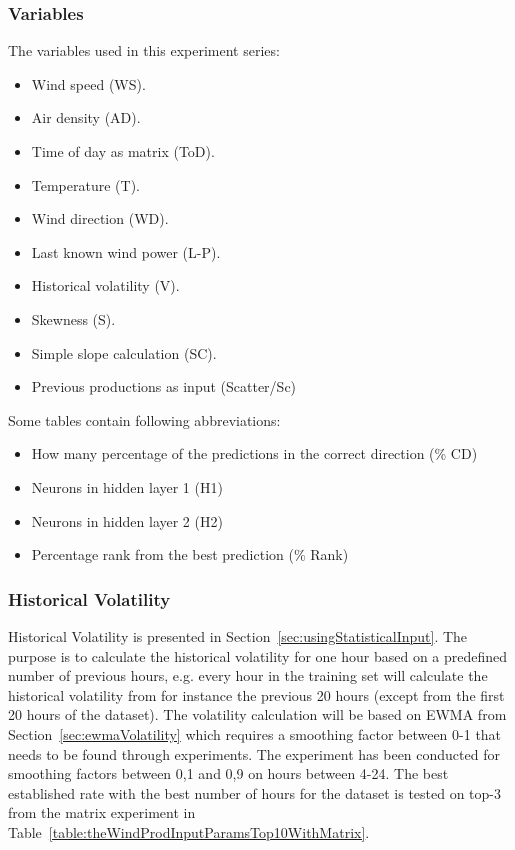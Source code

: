 \subsubsection{Variables}
The variables used in this experiment series:

\begin{itemize}
\item Wind speed (WS).
\item Air density (AD).
\item Time of day as matrix (ToD).
\item Temperature (T).
\item Wind direction (WD).
\item Last known wind power (L-P).
\item Historical volatility (V).
\item Skewness (S).
\item Simple slope calculation (SC).
\item Previous productions as input (Scatter/Sc)
\end{itemize}

Some tables contain following abbreviations:

\begin{itemize}
\item How many percentage of the predictions in the correct direction (\% CD)
\item Neurons in hidden layer 1 (H1)
\item Neurons in hidden layer 2 (H2)
\item Percentage rank from the best prediction (\% Rank)
\end{itemize}

\subsubsection{Historical Volatility}
\label{sec:predictionHistVol}
Historical Volatility is presented in Section~\ref{sec:usingStatisticalInput}. The purpose is to calculate the historical volatility for one hour based on a predefined number of previous hours, e.g. every hour in the training set will calculate the historical volatility from for instance the previous 20 hours (except from the first 20 hours of the dataset). The volatility calculation will be based on EWMA from Section~\ref{sec:ewmaVolatility} which requires a smoothing factor between 0-1 that needs to be found through experiments. The experiment has been conducted for smoothing factors between 0,1 and 0,9 on hours between 4-24. The best established rate with the best number of hours for the dataset is tested on top-3 from the matrix experiment in Table~\ref{table:theWindProdInputParamsTop10WithMatrix}.

